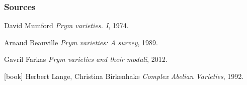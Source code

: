 \begin{frame}
\frametitle{Sources}

\begin{thebibliography}{9}

  David Mumford
  \newblock \textit{Prym varieties. {I}}, 1974.

  Arnaud Beauville
  \newblock \textit{Prym varieties: A survey}, 1989.

  Gavril Farkas
  \newblock \textit{Prym varieties and their moduli}, 2012.

  [book]
  Herbert Lange, Christina Birkenhake
  \newblock \textit{Complex Abelian Varieties}, 1992.

\end{thebibliography}
\end{frame}